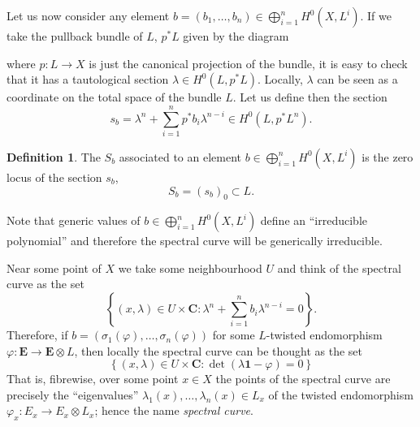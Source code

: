 \documentclass[12pt,a4paper]{book}
\theoremstyle{definition} \newtheorem{defn}[thm]{Definition}
\theoremstyle{definition} \newtheorem{ejemplo}[thm]{Example}
\theoremstyle{remark} \newtheorem{rem}[thm]{Remark}
\def\CC{\mathbf{C}}
\def\id{\mathbf{1}}
\newcommand{\ve}[1]{\mathbf{#1}}
\let\emph\relax
\begin{document}
      Let us now consider any element $b=(b_1,\dots,b_n) \in \bigoplus_{i=1}^n H^0(X,L^i)$. If we take the pullback bundle of $L$, $p^*L$ given by the diagram
      \begin{center}
       \end{center}
       where $p:L\rightarrow X$ is just the canonical projection of the bundle, it is easy to check that it has a tautological section $\lambda \in H^0(L,p^*L)$. Locally, $\lambda$ can be seen as a coordinate on the total space of the bundle $L$. Let us define then the section
       \begin{equation*}
	 s_b=\lambda^n + \sum_{i=1}^n p^* b_i \lambda^{n-i} \in H^0(L,p^*L^n).
       \end{equation*}

       \begin{defn}
	 The \emph{spectral curve} $S_b$ associated to an element $b \in \bigoplus_{i=1}^n H^0(X,L^i)$ is the zero locus of the section $s_b$,
	 \begin{equation*}
	   S_b=(s_b)_0 \subset L.
	 \end{equation*}
       \end{defn}
       Note that generic values of $b\in \bigoplus_{i=1}^n H^0(X,L^i)$ define an ``irreducible polynomial'' and therefore the spectral curve will be generically irreducible.

       Near some point of $X$ we take some neighbourhood $U$ and think of the spectral curve as the set 
       \begin{equation*}
	 \left\{ (x,\lambda) \in U\times \CC : \lambda^n + \sum_{i=1}^n b_i \lambda^{n-i} =0 \right\}.
       \end{equation*}
       Therefore, if $b=(\sigma_1(\varphi),\dots,\sigma_n(\varphi))$ for some $L$-twisted endomorphism $\varphi: \ve{E} \rightarrow \ve{E}\otimes L$, then locally the spectral curve can be thought as the set
       \begin{equation*}
	 \left\{ (x,\lambda) \in U\times \CC: \det(\lambda \id - \varphi)=0 \right\}
       \end{equation*}
       That is, fibrewise, over some point $x \in X$ the points of the spectral curve are precisely the ``eigenvalues'' $\lambda_1(x),\dots,\lambda_n(x) \in L_x$ of the twisted endomorphism $\varphi_x:E_x \rightarrow E_x \otimes L_x$; hence the name \textit{spectral curve}.
\end{document}
